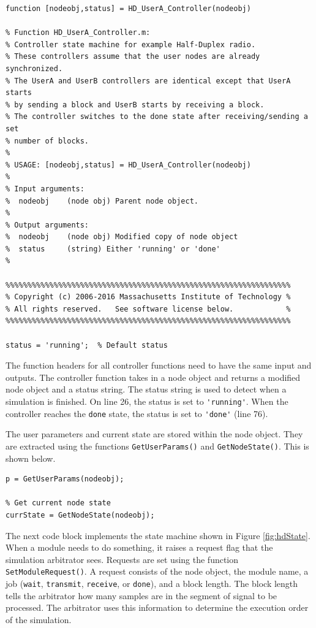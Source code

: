 \begin{lstlisting}[name=hdState]
function [nodeobj,status] = HD_UserA_Controller(nodeobj)

% Function HD_UserA_Controller.m:
% Controller state machine for example Half-Duplex radio.  
% These controllers assume that the user nodes are already synchronized.  
% The UserA and UserB controllers are identical except that UserA starts 
% by sending a block and UserB starts by receiving a block.  
% The controller switches to the done state after receiving/sending a set 
% number of blocks.
%
% USAGE: [nodeobj,status] = HD_UserA_Controller(nodeobj)
%
% Input arguments:
%  nodeobj    (node obj) Parent node object.  
%
% Output arguments:
%  nodeobj    (node obj) Modified copy of node object
%  status     (string) Either 'running' or 'done'
%

%%%%%%%%%%%%%%%%%%%%%%%%%%%%%%%%%%%%%%%%%%%%%%%%%%%%%%%%%%%%%%%%%
% Copyright (c) 2006-2016 Massachusetts Institute of Technology %
% All rights reserved.   See software license below.            %
%%%%%%%%%%%%%%%%%%%%%%%%%%%%%%%%%%%%%%%%%%%%%%%%%%%%%%%%%%%%%%%%%

status = 'running';  % Default status

\end{lstlisting}

The function headers for all controller functions need to have the
same input and outputs.  The controller function takes in a node
object and returns a modified node object and a status string.  The
status string is used to detect when a simulation is finished.  On
line 26, the status is set to \verb+'running'+.  When the controller
reaches the \verb+done+ state, the status is set to \verb+'done'+
(line 76).

The user parameters and current state are stored within the node
object.  They are extracted using the functions
\verb+GetUserParams()+ and \verb+GetNodeState()+.  This is shown
below.

\begin{lstlisting}[name=hdState]
% Load user parameters
p = GetUserParams(nodeobj);

% Get current node state
currState = GetNodeState(nodeobj);

\end{lstlisting}

The next code block implements the state machine shown in Figure
\ref{fig:hdState}.  When a module needs to do something, it raises a
request flag that the simulation arbitrator sees.  Requests are set
using the function \verb+SetModuleRequest()+.  A request consists of
the node object, the module name, a job (\verb+wait+,
\verb+transmit+, \verb+receive+, or \verb+done+), and a block
length. The block length tells the arbitrator how many samples are
in the segment of signal to be processed.  The arbitrator uses this
information to determine the execution order of the simulation.

